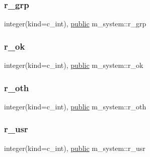 \mbox{\label{namespacem__system_adb853ed1f9d39c45e0b512ab39c66605}} 
\subsubsection{\texorpdfstring{r\+\_\+grp}{r\_grp}}
{\footnotesize\ttfamily integer(kind=c\+\_\+int), \hyperlink{M__stopwatch_83_8txt_a2f74811300c361e53b430611a7d1769f}{public} m\+\_\+system\+::r\+\_\+grp}

\mbox{\label{namespacem__system_a801e3ccad38d0814e4f1e62e939e9649}} 
\subsubsection{\texorpdfstring{r\+\_\+ok}{r\_ok}}
{\footnotesize\ttfamily integer(kind=c\+\_\+int), \hyperlink{M__stopwatch_83_8txt_a2f74811300c361e53b430611a7d1769f}{public} m\+\_\+system\+::r\+\_\+ok}

\mbox{\label{namespacem__system_a74de84d2cb6b74e9d0d4c5aa5f1ba953}} 
\subsubsection{\texorpdfstring{r\+\_\+oth}{r\_oth}}
{\footnotesize\ttfamily integer(kind=c\+\_\+int), \hyperlink{M__stopwatch_83_8txt_a2f74811300c361e53b430611a7d1769f}{public} m\+\_\+system\+::r\+\_\+oth}

\mbox{\label{namespacem__system_ace7825dd19ed7191b37d3a7a27c75431}} 
\subsubsection{\texorpdfstring{r\+\_\+usr}{r\_usr}}
{\footnotesize\ttfamily integer(kind=c\+\_\+int), \hyperlink{M__stopwatch_83_8txt_a2f74811300c361e53b430611a7d1769f}{public} m\+\_\+system\+::r\+\_\+usr}

